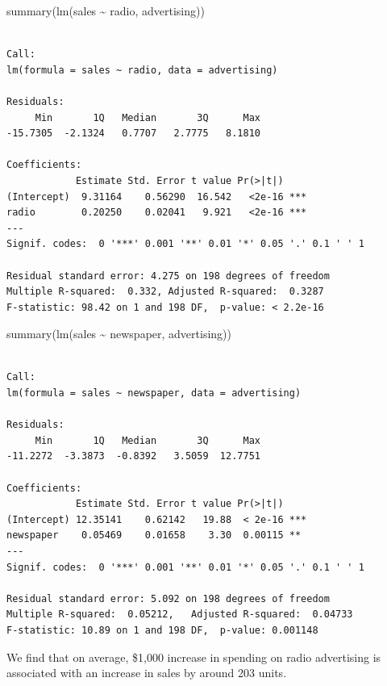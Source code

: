\documentclass[
  letterpaper,
  DIV=11,
  numbers=noendperiod]{scrreprt}
\newenvironment{Shaded}{\begin{snugshade}}{\end{snugshade}}
\newcommand{\FunctionTok}[1]{\textcolor[rgb]{0.28,0.35,0.67}{#1}}
\newcommand{\NormalTok}[1]{\textcolor[rgb]{0.00,0.23,0.31}{#1}}
\newcommand{\SpecialCharTok}[1]{\textcolor[rgb]{0.37,0.37,0.37}{#1}}
\begin{document}
\begin{Shaded}
\begin{Highlighting}[]
\FunctionTok{summary}\NormalTok{(}\FunctionTok{lm}\NormalTok{(sales }\SpecialCharTok{\textasciitilde{}}\NormalTok{ radio, advertising))}
\end{Highlighting}
\end{Shaded}

\begin{verbatim}

Call:
lm(formula = sales ~ radio, data = advertising)

Residuals:
     Min       1Q   Median       3Q      Max 
-15.7305  -2.1324   0.7707   2.7775   8.1810 

Coefficients:
            Estimate Std. Error t value Pr(>|t|)    
(Intercept)  9.31164    0.56290  16.542   <2e-16 ***
radio        0.20250    0.02041   9.921   <2e-16 ***
---
Signif. codes:  0 '***' 0.001 '**' 0.01 '*' 0.05 '.' 0.1 ' ' 1

Residual standard error: 4.275 on 198 degrees of freedom
Multiple R-squared:  0.332, Adjusted R-squared:  0.3287 
F-statistic: 98.42 on 1 and 198 DF,  p-value: < 2.2e-16
\end{verbatim}

\begin{Shaded}
\begin{Highlighting}[]
\FunctionTok{summary}\NormalTok{(}\FunctionTok{lm}\NormalTok{(sales }\SpecialCharTok{\textasciitilde{}}\NormalTok{ newspaper, advertising))}
\end{Highlighting}
\end{Shaded}

\begin{verbatim}

Call:
lm(formula = sales ~ newspaper, data = advertising)

Residuals:
     Min       1Q   Median       3Q      Max 
-11.2272  -3.3873  -0.8392   3.5059  12.7751 

Coefficients:
            Estimate Std. Error t value Pr(>|t|)    
(Intercept) 12.35141    0.62142   19.88  < 2e-16 ***
newspaper    0.05469    0.01658    3.30  0.00115 ** 
---
Signif. codes:  0 '***' 0.001 '**' 0.01 '*' 0.05 '.' 0.1 ' ' 1

Residual standard error: 5.092 on 198 degrees of freedom
Multiple R-squared:  0.05212,   Adjusted R-squared:  0.04733 
F-statistic: 10.89 on 1 and 198 DF,  p-value: 0.001148
\end{verbatim}

We find that on average, \$1,000 increase in spending on radio
advertising is associated with an increase in sales by around 203 units.
\end{document}
